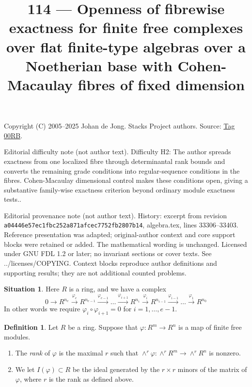 \documentclass{amsart}
\theoremstyle{plain}
\theoremstyle{definition}
\newtheorem{definition}[subsection]{Definition}
\newtheorem{situation}[subsection]{Situation}
\theoremstyle{remark}
\numberwithin{equation}{subsection}
\begin{document}
\title[Stacks Project, Tag 00RB]{114 --- Openness of fibrewise exactness for finite free complexes over flat finite-type algebras over a Noetherian base with Cohen-Macaulay fibres of fixed dimension}
\maketitle
\noindent Copyright (C) 2005--2025 Johan de Jong. Stacks Project authors. Source: \href{https://stacks.math.columbia.edu/tag/00RB}{Tag 00RB}.

\noindent Editorial difficulty note (not author text). Difficulty H2: The author spreads exactness from one localized fibre through determinantal rank bounds and converts the remaining grade conditions into regular-sequence conditions in the fibres. Cohen-Macaulay dimensional control makes these conditions open, giving a substantive family-wise exactness criterion beyond ordinary module exactness tests..

\noindent Editorial provenance note (not author text). History: excerpt from revision \texttt{a0444\allowbreak 6e57e\allowbreak c1fbc\allowbreak 252a8\allowbreak 71afc\allowbreak ec775\allowbreak 2fb28\allowbreak 07b14}, algebra.tex, lines 33306--33403. Reference presentation was adapted; original-author context and core support blocks were retained or added. The mathematical wording is unchanged. Licensed under GNU FDL 1.2 or later; no invariant sections or cover texts. See ../licenses/COPYING. Context blocks reproduce author definitions and supporting results; they are not additional counted problems.

\begin{situation}
\label{situation-complex}
Here $R$ is a ring, and we have a complex
$$
0
\to
R^{n_e}
\xrightarrow{\varphi_e}
R^{n_{e-1}}
\xrightarrow{\varphi_{e-1}}
\ldots
\xrightarrow{\varphi_{i + 1}}
R^{n_i}
\xrightarrow{\varphi_i}
R^{n_{i-1}}
\xrightarrow{\varphi_{i-1}}
\ldots
\xrightarrow{\varphi_1}
R^{n_0}
$$
In other words we require $\varphi_i \circ \varphi_{i + 1} = 0$
for $i = 1, \ldots, e - 1$.
\end{situation}

\begin{definition}
\label{definition-rank}
Let $R$ be a ring. Suppose that $\varphi : R^m \to R^n$ is a map
of finite free modules.
\begin{enumerate}
\item The {\it rank} of $\varphi$ is the maximal $r$ such that
$\wedge^r \varphi : \wedge^r R^m \to \wedge^r R^n$ is nonzero.
\item We let $I(\varphi) \subset R$ be the ideal generated by
the $r \times r$ minors of the matrix of $\varphi$, where $r$
is the rank as defined above.
\end{enumerate}
\end{definition}
\end{document}
